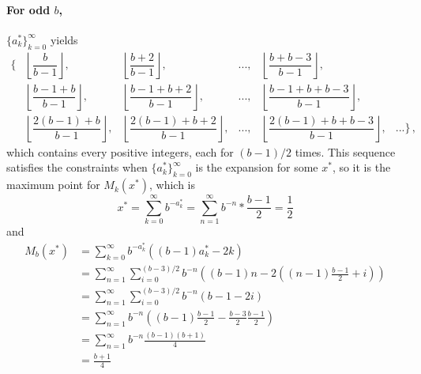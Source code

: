 \documentclass[]{article}
\begin{document}
\paragraph{For odd $b$,} $\{a_k^*\}_{k=0}^{\infty}$ yields
\[
\begin{matrix}
\Big\{&\left\lfloor\dfrac{b}{b-1}\right\rfloor,&\left\lfloor\dfrac{b + 2}{b-1}\right\rfloor, &..., &\left\lfloor\dfrac{b + b - 3}{b-1}\right\rfloor, &\\
&\left\lfloor\dfrac{b-1 + b}{b-1}\right\rfloor,&\left\lfloor\dfrac{b-1 + b + 2}{b-1}\right\rfloor,&...,&\left\lfloor\dfrac{b-1 + b + b - 3}{b-1}\right\rfloor,&\\
&\left\lfloor\dfrac{2(b-1) + b}{b-1}\right\rfloor,&\left\lfloor\dfrac{2(b-1) + b + 2}{b-1}\right\rfloor,&...,&\left\lfloor\dfrac{2(b-1) + b + b - 3}{b-1}\right\rfloor,&...\Big\}\,,
\end{matrix}
\]
which contains every positive integers, each for $(b-1)/2$ times. This sequence satisfies the constraints when $\{a_k^*\}_{k=0}^{\infty}$ is the expansion for some $x^*$, so it is the maximum point for $M_k(x^*)$, which is
\[
x^* = \sum_{k=0}^\infty b^{-a_k^*} = \sum_{n=1}^\infty b^{-n}*\frac{b-1}{2} = \frac{1}{2}
\]
and
\begin{align*}
M_b(x^*) &= \sum_{k=0}^\infty b^{-a_k^*}((b-1)a_k^*-2k)\\
 &= \sum_{n=1}^\infty\sum_{i=0}^{(b-3)/2} b^{-n}\left((b-1)n-2\left((n - 1)\frac{b-1}{2} + i \right)\right)\\
 &= \sum_{n=1}^\infty\sum_{i=0}^{(b-3)/2} b^{-n}(b-1-2i)\\
 &= \sum_{n=1}^\infty b^{-n}\left((b-1)\frac{b-1}{2}-\frac{b-3}{2}\frac{b-1}{2}\right)\\
  &= \sum_{n=1}^\infty b^{-n}\frac{(b-1)(b+1)}{4}\\
  &=\frac{b+1}{4}
\end{align*}
\end{document}

